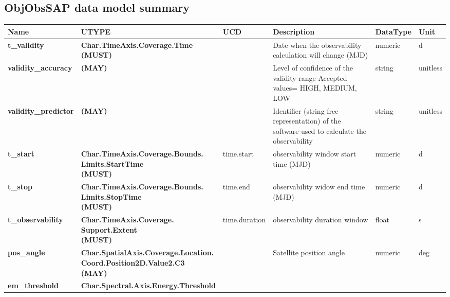 \documentclass[11pt,a4paper]{ivoatex/ivoa}
\begin{document}
\begin{appendices}
\section{ObjObsSAP data model summary}
\FloatBarrier
\begin{table}[h]
\tiny
\centering
\begin{adjustbox}{angle=90}
\begin{tabular}{|p{25mm}|p{50mm}|p{20mm}|p{40mm}|p{15mm}|p{10mm}|}
\hline
Name & UTYPE & UCD & Description & DataType & Unit \\
\hline
\textbf{t\_validity} & \textbf{Char.TimeAxis.Coverage.Time  \newline
(MUST)} & & Date when the \newline
observability calculation will change (MJD) &
numeric & d \\
\hline
\textbf{validity\_accuracy} & \textbf{(MAY)} & & Level of confidence
of the validity range \newline
Accepted values= HIGH, MEDIUM, LOW & string & unitless \\
\hline
\textbf{validity\_predictor} & \textbf{(MAY)} & & Identifier (string
free representation) of the software used to calculate the observability &
string & unitless\\
\hline
\textbf{t\_start} & \textbf{
Char.TimeAxis.Coverage.Bounds. \newline
Limits.StartTime  \newline
(MUST)} & time.start &
observability window start time (MJD) & numeric & d \\
\hline
\textbf{t\_stop} & \textbf{
Char.TimeAxis.Coverage.Bounds. \newline
Limits.StopTime \newline
(MUST)} & time.end &
observability widow end time (MJD) & numeric & d \\
\hline
\textbf{t\_observability} & \textbf{
Char.TimeAxis.Coverage. \newline
Support.Extent  \newline
(MUST)} & time.duration &
observability duration window & float & s \\
\hline
\textbf{pos\_angle} & \textbf{
Char.SpatialAxis.Coverage.Location. \newline
Coord.Position2D.Value2.C3  \newline
(MAY)} & & Satellite position angle & numeric & deg \\
\hline
\textbf{em\_threshold} & \textbf{
Char.Spectral.Axis.Energy.Threshold \newline
}
\end{tabular}
\end{adjustbox}
\end{table}
\end{appendices}
\end{document}
